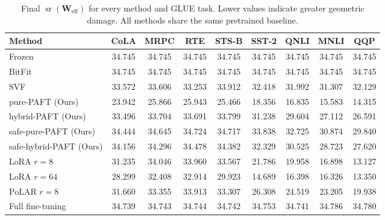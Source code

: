 \begin{table}[t]
\centering
\small
\caption{Final $\operatorname{sr}(\mathbf{W}_{\text{eff}})$ for every method and GLUE task. Lower values indicate greater geometric damage. All methods share the same pretrained baseline.}
\label{tab:sr_per_task}
\begin{tabular}{lcccccccc}
\toprule
\textbf{Method} & \textbf{CoLA} & \textbf{MRPC} & \textbf{RTE} & \textbf{STS-B} & \textbf{SST-2} & \textbf{QNLI} & \textbf{MNLI} & \textbf{QQP} \\
\midrule
Frozen & 34.745 & 34.745 & 34.745 & 34.745 & 34.745 & 34.745 & 34.745 & 34.745 \\
BitFit & 34.745 & 34.745 & 34.745 & 34.745 & 34.745 & 34.745 & 34.745 & 34.745 \\
\midrule
SVF & 33.572 & 33.606 & 33.253 & 33.912 & 32.418 & 31.992 & 31.307 & 32.129 \\
pure-PAFT (Ours) & 23.942 & 25.866 & 25.943 & 25.466 & 18.356 & 16.835 & 15.583 & 14.315 \\
hybrid-PAFT (Ours) & 33.496 & 33.704 & 33.691 & 33.799 & 31.238 & 29.604 & 27.112 & 26.591 \\
safe-pure-PAFT (Ours) & 34.444 & 34.645 & 34.724 & 34.717 & 33.838 & 32.725 & 30.874 & 29.840 \\
safe-hybrid-PAFT (Ours) & 34.156 & 34.296 & 34.478 & 34.382 & 32.329 & 30.525 & 28.723 & 27.620 \\
\midrule
LoRA $r{=}8$ & 31.235 & 34.046 & 33.960 & 33.567 & 21.786 & 19.958 & 16.898 & 13.127 \\
LoRA $r{=}64$ & 28.299 & 32.408 & 32.914 & 29.923 & 14.689 & 16.398 & 16.326 & 13.350 \\
PoLAR $r{=}8$ & 31.660 & 33.355 & 33.913 & 33.307 & 26.308 & 24.519 & 23.205 & 19.938 \\
\midrule
Full fine-tuning & 34.739 & 34.743 & 34.744 & 34.742 & 34.753 & 34.741 & 34.786 & 34.780 \\
\bottomrule
\end{tabular}
\end{table}